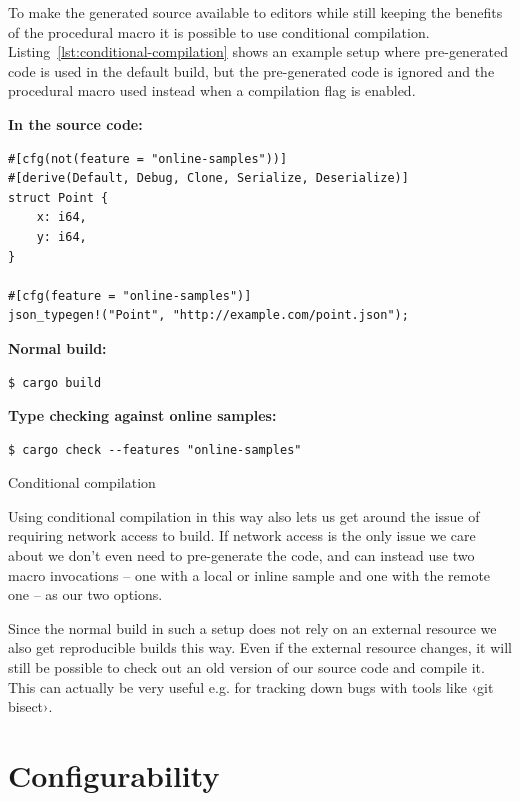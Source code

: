 To make the generated source available to editors while still keeping the benefits of the procedural macro it is possible to use conditional compilation. Listing~\ref{lst:conditional-compilation} shows an example setup where pre-generated code is used in the default build, but the pre-generated code is ignored and the procedural macro used instead when a compilation flag is enabled.

\begin{listing}[ht!]
\textbf{In the source code:}
\begin{verbatim}
#[cfg(not(feature = "online-samples"))]
#[derive(Default, Debug, Clone, Serialize, Deserialize)]
struct Point {
    x: i64,
    y: i64,
}

#[cfg(feature = "online-samples")]
json_typegen!("Point", "http://example.com/point.json");
\end{verbatim}
\vspace{5mm}

\textbf{Normal build:}
\begin{verbatim}
$ cargo build
\end{verbatim}
\vspace{5mm}

\textbf{Type checking against online samples:}
\begin{verbatim}
$ cargo check --features "online-samples"
\end{verbatim}
\caption{Conditional compilation}
\label{lst:conditional-compilation}
\end{listing}

Using conditional compilation in this way also lets us get around the issue of requiring network access to build. If network access is the only issue we care about we don't even need to pre-generate the code, and can instead use two macro invocations -- one with a local or inline sample and one with the remote one -- as our two options.

Since the normal build in such a setup does not rely on an external resource we also get reproducible builds this way. Even if the external resource changes, it will still be possible to check out an old version of our source code and compile it. This can actually be very useful e.g. for tracking down bugs with tools like ‹git bisect›.

\section{Configurability}

